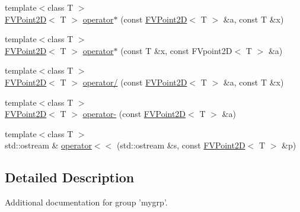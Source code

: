 \begin{DoxyCompactItemize}
\item 
{\footnotesize template$<$class T $>$ }\\\hyperlink{classFVPoint2D}{FVPoint2D}$<$ T $>$ \hyperlink{group__FVPoint2D_ga4bd99f7765dfe89c3d604c9869199e70}{operator$\ast$} (const \hyperlink{classFVPoint2D}{FVPoint2D}$<$ T $>$ \&a, const T \&x)
\item 
{\footnotesize template$<$class T $>$ }\\\hyperlink{classFVPoint2D}{FVPoint2D}$<$ T $>$ \hyperlink{group__FVPoint2D_ga33ef3d47d5f25efdc6bdf7176e374778}{operator$\ast$} (const T \&x, const FVpoint2D$<$ T $>$ \&a)
\item 
{\footnotesize template$<$class T $>$ }\\\hyperlink{classFVPoint2D}{FVPoint2D}$<$ T $>$ \hyperlink{group__FVPoint2D_ga4ae7766bcafa795d446813b5ecfbabad}{operator/} (const \hyperlink{classFVPoint2D}{FVPoint2D}$<$ T $>$ \&a, const T \&x)
\item 
{\footnotesize template$<$class T $>$ }\\\hyperlink{classFVPoint2D}{FVPoint2D}$<$ T $>$ \hyperlink{group__FVPoint2D_ga209f554d792ea630ece13d82e122f149}{operator-\/} (const \hyperlink{classFVPoint2D}{FVPoint2D}$<$ T $>$ \&a)
\item 
{\footnotesize template$<$class T $>$ }\\std::ostream \& \hyperlink{group__FVPoint2D_ga1f20f9e0aa6bcd31fbfc819c3d9f1e29}{operator$<$$<$} (std::ostream \&s, const \hyperlink{classFVPoint2D}{FVPoint2D}$<$ T $>$ \&p)
\end{DoxyCompactItemize}


\subsection{Detailed Description}
Additional documentation for group 'mygrp'. 

